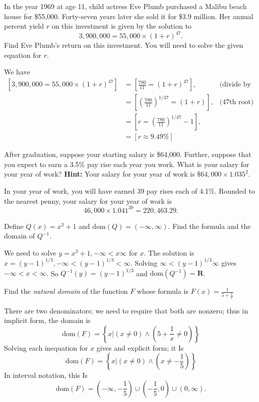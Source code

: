 \documentclass[12pt, answers,fleqn]{exam}
\newcommand{\reals}{\mathbf{R}}
\newcommand{\dom}{\mbox{dom}}
\begin{document}
\begin{questions}
\question  In the year 1969 at age 11, child actress Eve Plumb purchased a Malibu beach house for \$55,000. Forty-seven years
later she sold it for \$3.9 million. Her annual percent yield $r$ on this investment is given by the solution to
\[
       3, 900,000 = 55,000 \times (1 + r)^{47}.
\]
Find Eve Plumb's return on this investment. You will need to solve the given equation for $r$.
    \begin{solution}%
        We have
        \begin{align*}
            \left [3, 900,000 = 55,000 \times (1 + r)^{47} \right] &= 
           \left [\frac{780}{11} = (1 + r)^{47} \right] , &\mbox{(divide by 55000)}\\
            &= \left [\left(\frac{780}{11}\right)^{1/47} = (1 + r) \right] , &\mbox{(47th root)}\\
            &= \left [r = \left(\frac{780}{11} \right)^{1/47} - 1 \right], \\
            &= \left [r \approx 9.49\% \right ]
        \end{align*}
    \end{solution}
    \question   After graduation, suppose your starting salary is \$64,000. Further, suppose
that you expect to earn a 3.5\% pay rise each year you work. What is your salary for 
your  year of work?  \textbf{Hint:} Your salary for your  year of work
is $\$64,000 \times 1.035^2$.
\begin{solution}%
In your  year of work, you will have earned 39 pay rises each of 4.1\%. Rounded to 
the nearest penny, your salary for your  year of work is
\begin{equation*}
   46,000 \times 1.041^{39} = 220,463.29.
 \end{equation*}   
\end{solution}

\question   Define $Q(x) = x^3 + 1$ and $\dom(Q) = (-\infty,\infty)$. Find the formula
and the domain of $Q^{-1}$. 
\begin{solution} 
    We need to solve $y = x^3+1, -\infty < x \infty $ for $x$. The
    solution is $x = (y-1)^{1/3}, -\infty < (y-1)^{1/3} < \infty $. 
    Solving $\infty < (y-1)^{1/3} \infty$ gives $ -\infty < x < \infty$.
    So  $Q^{-1}(y) = (y-1)^{1/3}$ and $\dom(Q^{-1}) = \reals$.
\end{solution}
    \question   Find the \emph{natural domain} of the function $F$ whose
formula is $F(x) = \frac{1}{5+ \frac{1}{x}}$
\begin{solution}%
    There are two denominators; we need to require that both are nonzero; thus
    in implicit form, the domain is
    \[
        \dom(F) = \left \{ x | (x \neq 0) \land (5+ \frac{1}{x} \neq 0) \right \}
    \]
    Solving each inequation for $x$ gives and explicit form; it Is
    \[
        \dom(F) = \left \{ x | (x \neq 0) \land (x  \neq -\frac{1}{5}) \right \}
    \]
    In interval notation, this Is
    \[   \dom(F) = (-\infty, -\frac{1}{5}) \cup (-\frac{1}{5},0) \cup
          (0, \infty).
        \]
\end{solution}




\end{questions}
\end{document}
